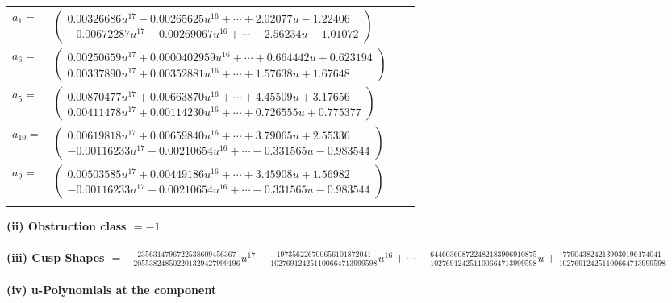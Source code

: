 \documentclass[1p]{elsarticle_modified}
\theoremstyle{definition}
\begin{document}
\begin{tabular}{m{7pt} m{180pt} m{7pt} m{180pt} }
\flushright $a_{1}=$&$\begin{pmatrix}0.00326686 u^{17}-0.00265625 u^{16}+\cdots+2.02077 u-1.22406\\-0.00672287 u^{17}-0.00269067 u^{16}+\cdots-2.56234 u-1.01072\end{pmatrix}$ \\
\flushright $a_{6}=$&$\begin{pmatrix}0.00250659 u^{17}+0.0000402959 u^{16}+\cdots+0.664442 u+0.623194\\0.00337890 u^{17}+0.00352881 u^{16}+\cdots+1.57638 u+1.67648\end{pmatrix}$ \\
\flushright $a_{5}=$&$\begin{pmatrix}0.00870477 u^{17}+0.00663870 u^{16}+\cdots+4.45509 u+3.17656\\0.00411478 u^{17}+0.00114230 u^{16}+\cdots+0.726555 u+0.775377\end{pmatrix}$ \\
\flushright $a_{10}=$&$\begin{pmatrix}0.00619818 u^{17}+0.00659840 u^{16}+\cdots+3.79065 u+2.55336\\-0.00116233 u^{17}-0.00210654 u^{16}+\cdots-0.331565 u-0.983544\end{pmatrix}$ \\
\flushright $a_{9}=$&$\begin{pmatrix}0.00503585 u^{17}+0.00449186 u^{16}+\cdots+3.45908 u+1.56982\\-0.00116233 u^{17}-0.00210654 u^{16}+\cdots-0.331565 u-0.983544\end{pmatrix}$\\&\end{tabular}
\flushleft \textbf{(ii) Obstruction class $= -1$}\\~\\
\flushleft \textbf{(iii) Cusp Shapes $= -\frac{2356314796722538609456367}{205538248502201329427999196} u^{17}-\frac{197356226700656101872041}{102769124251100664713999598} u^{16}+\cdots-\frac{644603608722482183906910875}{102769124251100664713999598} u+\frac{7790438242139030196174041}{102769124251100664713999598}$}\\~\\
\newpage\renewcommand{\arraystretch}{1}
\flushleft \textbf{(iv) u-Polynomials at the component}\newline \\
\end{document}

